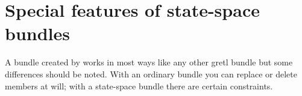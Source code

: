 


\section{Special features of state-space bundles}
\label{sec:ss-special}

A bundle created by  works in most ways like any other
gretl bundle but some differences should be noted.  With an ordinary
bundle you can replace or delete members at will; with a state-space
bundle there are certain constraints.

